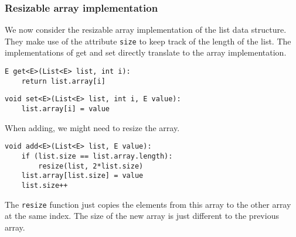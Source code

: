 \documentclass[a4paper, openany]{memoir}
\begin{document}
\subsubsection{Resizable array implementation}
We now consider the resizable array implementation of the list data structure. They make use of the attribute \texttt{size} to keep track of the length of the list. The implementations of get and set directly translate to the array implementation.
\begin{lstlisting}[language=pseudocode]
E get<E>(List<E> list, int i):
    return list.array[i]
\end{lstlisting}
\begin{lstlisting}[language=pseudocode]
void set<E>(List<E> list, int i, E value):
    list.array[i] = value
\end{lstlisting}
When adding, we might need to resize the array.
\begin{lstlisting}[language=pseudocode]
void add<E>(List<E> list, E value):
    if (list.size == list.array.length):
        resize(list, 2*list.size)
    list.array[list.size] = value
    list.size++
\end{lstlisting}
The \texttt{resize} function just copies the elements from this array to the other array at the same index. The size of the new array is just different to the previous array. 
\end{document}
